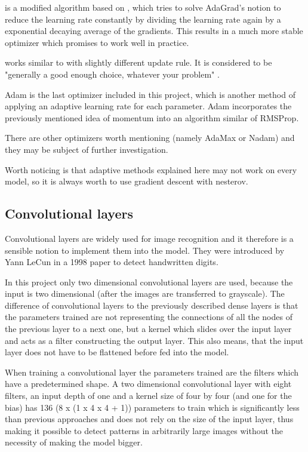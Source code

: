   \cite{Zeiler2012} is a modified algorithm based on , which tries to solve AdaGrad's notion to reduce the learning rate constantly by dividing the learning rate again by a exponential decaying average of the gradients.
 This results in a much more stable optimizer which promises to work well in practice.

  \cite{Hinton2012} works similar to  with slightly different update rule.
It is considered to be "generally a good enough choice, whatever your problem" \cite[p.77]{Chollet2017}.

Adam \cite{Kingma2014}\cite{Reddi2018} is the last optimizer included in this project, which is another method of applying an adaptive learning rate for each parameter.
Adam incorporates the previously mentioned idea of momentum into an algorithm similar of RMSProp.

There are other optimizers worth mentioning (namely AdaMax or Nadam) and they may be subject of further investigation.

Worth noticing is that adaptive methods explained here may not work on every model, so it is always worth to use gradient descent with nesterov\cite[p.358]{Geron2019}.

\subsection{Convolutional layers}

Convolutional layers are widely used for image recognition and it therefore is a sensible notion to implement them into the model.
They were introduced by Yann LeCun in a 1998 paper \cite{LeCun1998} to detect handwritten digits.

In this project only two dimensional convolutional layers are used, because the input is two dimensional (after the images are transferred to grayscale).
The difference of convolutional layers to the previously described dense layers is that the parameters trained are not representing the connections of all the nodes of the previous layer to a next one, but a kernel which slides over the input layer and acts as a filter constructing the output layer.
This also means, that the input layer does not have to be flattened before fed into the model.

When training a convolutional layer the parameters trained are the filters which have a predetermined shape.
A two dimensional convolutional layer with eight filters, an input depth of one  and a kernel size of four by four (and one for the bias) has 136 (8 x (1 x 4 x 4 + 1)) parameters to train which is significantly less than previous approaches and does not rely on the size of the input layer, thus making it possible to detect patterns in arbitrarily large images without the necessity of making the model bigger.

